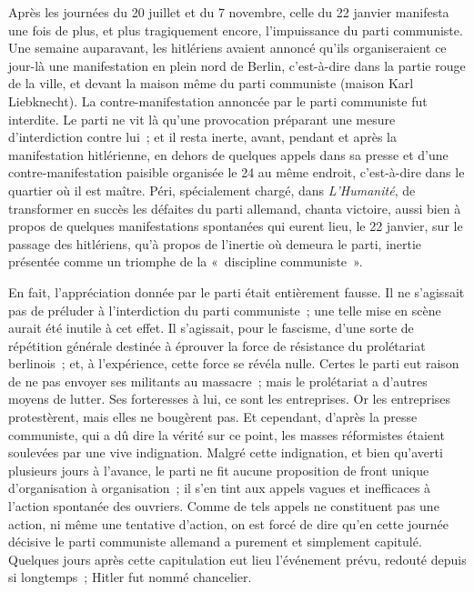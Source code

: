 \documentclass[french,twoside]{book} %
\begin{document}
Après les journées du 20 juillet et du 7 novembre, celle du 22 janvier manifesta une fois de plus, et plus tragiquement encore, l'impuissance du parti communiste. Une semaine auparavant, les hitlériens avaient annoncé qu'ils organiseraient ce jour-là une manifestation en plein nord de Berlin, c'est-à-dire dans la partie rouge de la ville, et devant la maison même du parti communiste (maison Karl Liebknecht). La contre-manifestation annoncée par le parti communiste fut interdite. Le parti ne vit là qu'une provocation préparant une mesure d'interdiction contre lui ; et il resta inerte, avant, pendant et après la manifestation hitlérienne, en dehors de quelques appels dans sa presse et d'une contre-manifestation paisible organisée le 24 au même endroit, c'est-à-dire dans le quartier où il est maître. Péri, spécialement chargé, dans {\itshape L'Humanité}, de transformer en succès les défaites du parti allemand, chanta victoire, aussi bien à propos de quelques manifestations spontanées qui eurent lieu, le 22 janvier, sur le passage des hitlériens, qu'à propos de l'inertie où demeura le parti, inertie présentée comme un triomphe de la « discipline communiste ».\par
En fait, l'appréciation donnée par le parti était entièrement fausse. Il ne s'agissait pas de préluder à l'interdiction du parti communiste ; une telle mise en scène aurait été inutile à cet effet. Il s'agissait, pour le fascisme, d'une sorte de répétition générale destinée à éprouver la force de résistance du prolétariat berlinois ; et, à l'expérience, cette force se révéla nulle. Certes le parti eut raison de ne pas envoyer ses militants au massacre ; mais le prolétariat a d'autres moyens de lutter. Ses forteresses à lui, ce sont les entreprises. Or les entreprises protestèrent, mais elles ne bougèrent pas. Et cependant, d'après la presse communiste, qui a dû dire la vérité sur ce point, les masses réformistes étaient soulevées par une vive indignation. Malgré cette indignation, et bien qu'averti plusieurs jours à l'avance, le parti ne fit aucune proposition de front unique d'organisation à organisation ; il s'en tint aux appels vagues et ineffi­caces à l'action spontanée des ouvriers. Comme de tels appels ne constituent pas une action, ni même une tentative d'action, on est forcé de dire qu'en cette journée décisive le parti communiste allemand a purement et simplement capitulé. Quelques jours après cette capitulation eut lieu l'événement prévu, redouté depuis si longtemps ; Hitler fut nommé chancelier.\par
\end{document}

